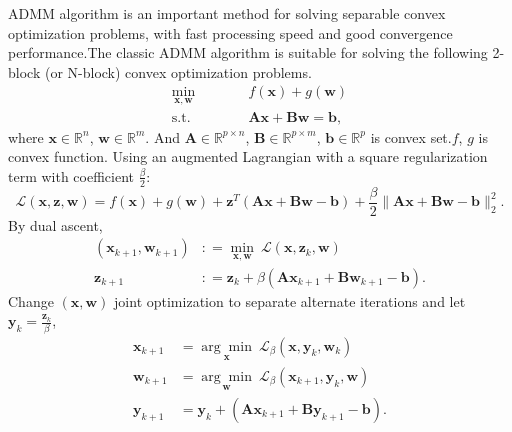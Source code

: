 \documentclass{article}
\begin{document}
{ADMM algorithm is an important method for solving separable convex optimization problems, with fast processing speed and good convergence performance.The classic ADMM algorithm is suitable for solving the following 2-block (or N-block) convex optimization problems.
\begin{equation}
    \begin{aligned}
        \underset{\mathbf x,\mathbf w}{\min}\qquad&\quad f(\mathbf x) + g(\mathbf w)\\
        \text{s.t.}\qquad&\quad  \mathbf A\mathbf x+\mathbf B\mathbf w = \mathbf b,
    \end{aligned}
    \label{admmlg}
\end{equation}
where $\mathbf x \in \mathbb{R}^n$, $\mathbf w \in \mathbb{R}^m$. And $\mathbf A \in \mathbb{R}^{p \times n}$, $\mathbf B \in \mathbb{R}^{p \times m}$, $\mathbf b \in \mathbb{R}^p$ is convex set.$f$, $g$ is convex function.
Using an augmented Lagrangian with a square regularization term with coefficient $\frac{\beta}{2}$:
\begin{equation}
    \mathcal{L}(\mathbf x,\mathbf z,\mathbf w) = f(\mathbf x) +g(\mathbf w) + \mathbf z^T(\mathbf A\mathbf x+\mathbf B\mathbf w-\mathbf b) + \frac{\beta}{2} \lVert \mathbf A\mathbf x+\mathbf B\mathbf w-\mathbf b \rVert_2^2.
\end{equation}
By dual ascent,
\begin{equation}
    \begin{aligned}
        (\mathbf x_{k+1},\mathbf w_{k+1}) & \colon = \underset{\mathbf x,\mathbf w}{\min}\ \mathcal{L}(\mathbf x,\mathbf z_k,\mathbf w)\\
        \mathbf z_{k+1} & \colon = \mathbf z_k + \beta (\mathbf A \mathbf x_{k+1} + \mathbf B \mathbf w_{k+1} - \mathbf b).
    \end{aligned}
\end{equation}
Change $(\mathbf x,\mathbf w)$ joint optimization to separate alternate iterations and let $\mathbf y_k = \frac{\mathbf z_k}{\beta}$,
\begin{equation}
    \begin{aligned}
        \mathbf x_{k+1} &  = \underset{\mathbf x}{\arg\min}\  \mathcal{L}_{\beta}(\mathbf x,\mathbf y_k,\mathbf w_{k})\\
        \mathbf w_{k+1} &  = \underset{\mathbf w}{\arg\min}\  \mathcal{L}_{\beta}(\mathbf x_{k+1},\mathbf y_k,\mathbf w)\\
        \mathbf y_{k+1} &  = \mathbf y_k + (\mathbf A \mathbf x_{k+1} + \mathbf B \mathbf y_{k+1} - \mathbf b).
    \end{aligned}
\end{equation}

}
\end{document}
